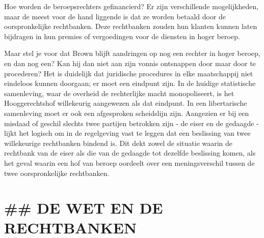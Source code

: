 \documentclass[
  a5paper,
  smalldemyvopaper,10pt,twoside,onecolumn,openright,extrafontsizes,hidelinks]{memoir}
\begin{document}
Hoe worden de beroepsrechters gefinancierd? Er zijn verschillende
mogelijkheden, maar de meest voor de hand liggende is dat ze worden
betaald door de oorspronkelijke rechtbanken. Deze rechtbanken zouden hun
klanten kunnen laten bijdragen in hun premies of vergoedingen voor de
diensten in hoger beroep.

Maar stel je voor dat Brown blijft aandringen op nog een rechter in
hoger beroep, en dan nog een? Kan hij dan niet aan zijn vonnis
ontsnappen door maar door te procederen? Het is duidelijk dat juridische
procedures in elke maatschappij niet eindeloos kunnen doorgaan; er moet
een eindpunt zijn. In de huidige statistische samenleving, waar de
overheid de rechterlijke macht monopoliseert, is het Hooggerechtshof
willekeurig aangewezen als dat eindpunt. In een libertarische
samenleving moet er ook een afgesproken scheidslijn zijn. Aangezien er
bij een misdaad of geschil slechts twee partijen betrokken zijn - de
eiser en de gedaagde - lijkt het logisch om in de regelgeving vast te
leggen dat een beslissing van twee willekeurige rechtbanken bindend is.
Dit dekt zowel de situatie waarin de rechtbank van de eiser als die van
de gedaagde tot dezelfde beslissing komen, als het geval waarin een hof
van beroep oordeelt over een meningsverschil tussen de twee
oorspronkelijke rechtbanken.

\section{\#\# DE WET EN DE RECHTBANKEN}\label{de-wet-en-de-rechtbanken}
\end{document}
